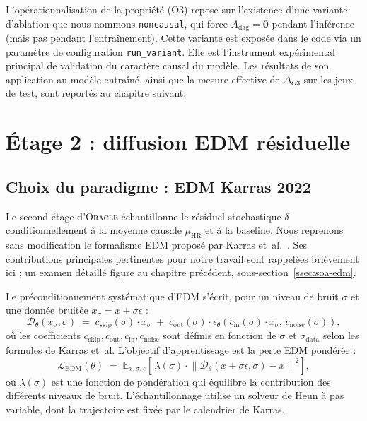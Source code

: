 \documentclass[14pt,a4paper,openany]{extreport}
\theoremstyle{definition}
\newcommand{\Oracle}{\textsc{Oracle}}
\newcommand{\HR}{\ensuremath{\text{HR}}}
\newcommand{\muHR}{\ensuremath{\mu_{\HR}}}
\newcommand{\Adag}{\ensuremath{A_{\mathrm{dag}}}}
\newcommand{\LEDM}{\ensuremath{\mathcal{L}_{\mathrm{EDM}}}}
\begin{document}
L'opérationnalisation de la propriété (O3) repose sur l'existence d'une variante d'ablation que nous nommons \texttt{noncausal}, qui force $\Adag = \mathbf{0}$ pendant l'inférence (mais pas pendant l'entraînement). Cette variante est exposée dans le code via un paramètre de configuration \texttt{run\_variant}. Elle est l'instrument expérimental principal de validation du caractère causal du modèle. Les résultats de son application au modèle entraîné, ainsi que la mesure effective de $\Delta_{O3}$ sur les jeux de test, sont reportés au chapitre suivant.

\section{Étage 2 : diffusion EDM résiduelle}
\label{sec:oracle-edm}

\subsection{Choix du paradigme : EDM Karras 2022}
\label{ssec:oracle-edm-choix}

Le second étage d'\Oracle{} échantillonne le résiduel stochastique $\delta$ conditionnellement à la moyenne causale $\muHR$ et à la baseline. Nous reprenons sans modification le formalisme EDM proposé par Karras et~al.~\cite{karras_edm_2022}. Ses contributions principales pertinentes pour notre travail sont rappelées brièvement ici ; un examen détaillé figure au chapitre précédent, sous-section~\ref{ssec:soa-edm}.

Le préconditionnement systématique d'EDM s'écrit, pour un niveau de bruit $\sigma$ et une donnée bruitée $x_\sigma = x + \sigma \epsilon$ :
\begin{equation}
  \mathcal{D}_\theta(x_\sigma, \sigma) \;=\; c_{\mathrm{skip}}(\sigma) \cdot x_\sigma \;+\; c_{\mathrm{out}}(\sigma) \cdot \epsilon_\theta\!\left( c_{\mathrm{in}}(\sigma) \cdot x_\sigma,\, c_{\mathrm{noise}}(\sigma) \right),
  \label{eq:edm-precond}
\end{equation}
où les coefficients $c_{\mathrm{skip}}, c_{\mathrm{out}}, c_{\mathrm{in}}, c_{\mathrm{noise}}$ sont définis en fonction de $\sigma$ et $\sigma_{\mathrm{data}}$ selon les formules de Karras et~al. L'objectif d'apprentissage est la perte EDM pondérée :
\begin{equation}
  \LEDM(\theta) \;=\; \mathbb{E}_{x, \sigma, \epsilon}\!\left[\, \lambda(\sigma) \cdot \left\| \mathcal{D}_\theta\!\left( x + \sigma \epsilon, \sigma \right) - x \right\|^2 \right],
  \label{eq:edm-loss}
\end{equation}
où $\lambda(\sigma)$ est une fonction de pondération qui équilibre la contribution des différents niveaux de bruit. L'échantillonnage utilise un solveur de Heun à pas variable, dont la trajectoire est fixée par le calendrier de Karras.
\end{document}
